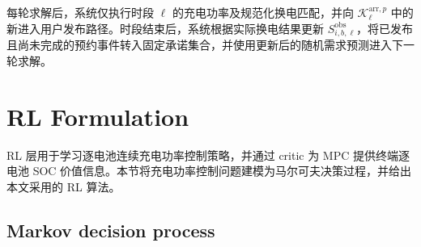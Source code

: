 \documentclass[12pt,a4paper,UTF8]{ctexart}
\begin{document}
每轮求解后，系统仅执行时段 $\ell$ 的充电功率及规范化换电匹配，并向 $\mathcal K_\ell^{\mathrm{arr},p}$ 中的新进入用户发布路径。时段结束后，系统根据实际换电结果更新 $S_{i,b,\ell}^{\mathrm{obs}}$，将已发布且尚未完成的预约事件转入固定承诺集合，并使用更新后的随机需求预测进入下一轮求解。


\section{RL Formulation}

RL 层用于学习逐电池连续充电功率控制策略，并通过 critic 为 MPC 提供终端逐电池 SOC 价值信息。本节将充电功率控制问题建模为马尔可夫决策过程，并给出本文采用的 RL 算法。

\subsection{Markov decision process}
\end{document}
